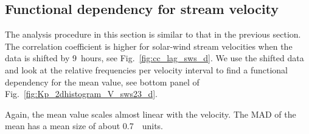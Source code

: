 \subsection{Functional dependency for stream velocity}
The analysis procedure in this section is similar to that in the previous section. The correlation coefficient is higher for solar-wind stream velocities when the data is shifted by 9~hours, see Fig.~\ref{fig:cc_lag_sws_d}.
We use the shifted data and look at the relative frequencies per velocity interval to find a functional dependency for the mean \Kp{} value, see bottom panel of Fig.~\ref{fig:Kp_2dhistogram_V_sws23_d}.
\begin{figure}
\end{figure}
Again, the mean \Kp{} value scales almost linear with the velocity. The MAD of the mean has a mean size of about \SI{0.7}{\Kp~units}.

